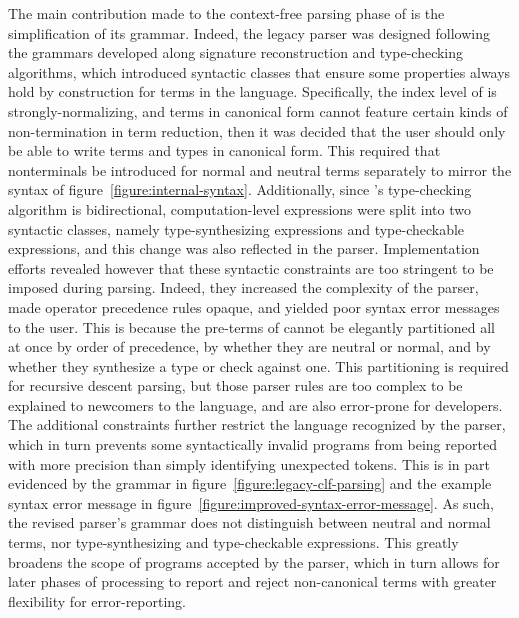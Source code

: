 The main contribution made to the context-free parsing phase of \Beluga is the simplification of its grammar.
Indeed, the legacy parser was designed following the grammars developed along signature reconstruction and type-checking algorithms, which introduced syntactic classes that ensure some properties always hold by construction for terms in the language.
Specifically, the index level \LF of \Beluga is strongly-normalizing, and \LF terms in canonical form cannot feature certain kinds of non-termination in term reduction, then it was decided that the user should only be able to write \LF terms and types in canonical form.
This required that nonterminals be introduced for normal and neutral terms separately to mirror the syntax of figure~\ref{figure:internal-syntax}.
Additionally, since \Beluga's type-checking algorithm is bidirectional, computation-level expressions were split into two syntactic classes, namely type-synthesizing expressions and type-checkable expressions, and this change was also reflected in the parser.
Implementation efforts revealed however that these syntactic constraints are too stringent to be imposed during parsing.
Indeed, they increased the complexity of the parser, made operator precedence rules opaque, and yielded poor syntax error messages to the user.
This is because the pre-terms of \Beluga cannot be elegantly partitioned all at once by order of precedence, by whether they are neutral or normal, and by whether they synthesize a type or check against one.
This partitioning is required for recursive descent parsing, but those parser rules are too complex to be explained to newcomers to the language, and are also error-prone for developers.
The additional constraints further restrict the language recognized by the parser, which in turn prevents some syntactically invalid programs from being reported with more precision than simply identifying unexpected tokens.
This is in part evidenced by the grammar in figure~\ref{figure:legacy-clf-parsing} and the example syntax error message in figure~\ref{figure:improved-syntax-error-message}.
As such, the revised parser's grammar does not distinguish between neutral and normal terms, nor type-synthesizing and type-checkable expressions.
This greatly broadens the scope of programs accepted by the parser, which in turn allows for later phases of processing to report and reject non-canonical terms with greater flexibility for error-reporting.

